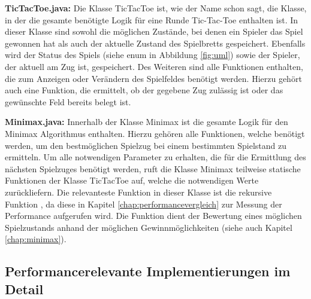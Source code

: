 \textbf{TicTacToe.java:} Die Klasse TicTacToe ist, wie der Name schon sagt, die Klasse, in der die gesamte benötigte Logik für eine Runde
Tic-Tac-Toe enthalten ist. In dieser Klasse sind sowohl die möglichen Zustände, bei denen ein Spieler das Spiel gewonnen hat als auch der
aktuelle Zustand des Spielbretts gespeichert. Ebenfalls wird der Status des Spiels (siehe enum in Abbildung \ref{fig:uml}) sowie der Spieler, der aktuell
am Zug ist, gespeichert. Des Weiteren sind alle Funktionen enthalten, die zum Anzeigen oder Verändern des Spielfeldes benötigt werden. Hierzu
gehört auch eine Funktion, die ermittelt, ob der gegebene Zug zulässig ist oder das gewünschte Feld bereits belegt ist.

\textbf{Minimax.java:} Innerhalb der Klasse Minimax ist die gesamte Logik für den Minimax Algorithmus enthalten. Hierzu gehören alle Funktionen,
welche benötigt werden, um den bestmöglichen Spielzug bei einem bestimmten Spielstand zu ermitteln. Um alle notwendigen Parameter zu erhalten,
die für die Ermittlung des nächsten Spielzuges benötigt werden, ruft die Klasse Minimax teilweise statische Funktionen der Klasse TicTacToe auf,
welche die notwendigen Werte zurückliefern. Die relevanteste Funktion in dieser Klasse ist die rekursive Funktion , 
da diese in Kapitel \ref{chap:performancevergleich} zur Messung der Performance aufgerufen wird. Die Funktion dient der Bewertung eines möglichen 
Spielzustands anhand der möglichen Gewinnmöglichkeiten (siehe auch Kapitel \ref{chap:minimax}).

\subsection{Performancerelevante Implementierungen im Detail}
\label{chap:implementierungen}
